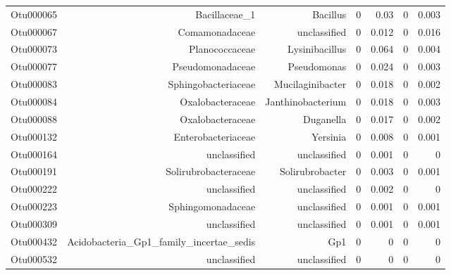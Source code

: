 \begin{table}[ht]
\begin{tabular}{crrrrrr}
  Otu000065 & Bacillaceae\_1 & Bacillus & 0 & 0.03 & 0 & 0.003 \\ 
  Otu000067 & Comamonadaceae & unclassified & 0 & 0.012 & 0 & 0.016 \\ 
  Otu000073 & Planococcaceae & Lysinibacillus & 0 & 0.064 & 0 & 0.004 \\ 
  Otu000077 & Pseudomonadaceae & Pseudomonas & 0 & 0.024 & 0 & 0.003 \\ 
  Otu000083 & Sphingobacteriaceae & Mucilaginibacter & 0 & 0.018 & 0 & 0.002 \\ 
  Otu000084 & Oxalobacteraceae & Janthinobacterium & 0 & 0.018 & 0 & 0.003 \\ 
  Otu000088 & Oxalobacteraceae & Duganella & 0 & 0.017 & 0 & 0.002 \\ 
  Otu000132 & Enterobacteriaceae & Yersinia & 0 & 0.008 & 0 & 0.001 \\ 
  Otu000164 & unclassified & unclassified & 0 & 0.001 & 0 & 0 \\ 
  Otu000191 & Solirubrobacteraceae & Solirubrobacter & 0 & 0.003 & 0 & 0.001 \\ 
  Otu000222 & unclassified & unclassified & 0 & 0.002 & 0 & 0 \\ 
  Otu000223 & Sphingomonadaceae & unclassified & 0 & 0.001 & 0 & 0.001 \\ 
  Otu000309 & unclassified & unclassified & 0 & 0.001 & 0 & 0.001 \\ 
  Otu000432 & Acidobacteria\_Gp1\_family\_incertae\_sedis & Gp1 & 0 & 0 & 0 & 0 \\ 
  Otu000532 & unclassified & unclassified & 0 & 0 & 0 & 0 \\ 
   \hline
\end{tabular}
\end{table}
